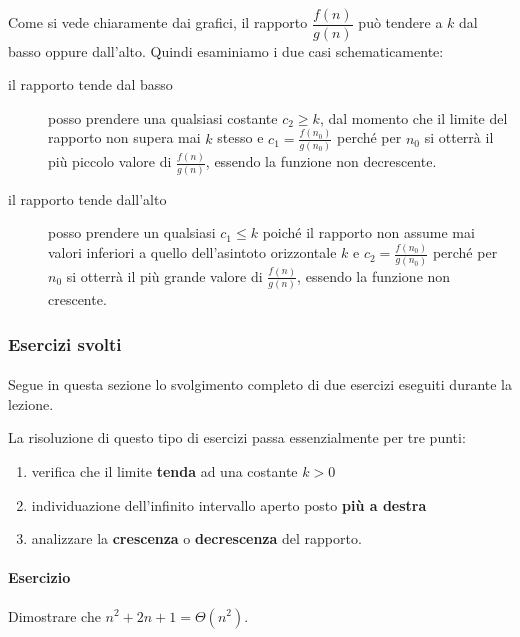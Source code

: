 \documentclass[11pt,a4paper,oneside]{article}
\begin{document}
\paragraph*{}Come si vede chiaramente dai grafici, il rapporto $\dfrac{f(n)}{g(n)}$ può tendere a $k$ dal basso oppure dall'alto. Quindi esaminiamo i due casi schematicamente:
\begin{description}
	\item[il rapporto tende dal basso] posso prendere una qualsiasi costante $c_2 \geq k$, dal momento che il limite del rapporto non supera mai $k$ stesso e $c_1 = \frac{f(n_0)}{g(n_0)}$ perché per $n_0$ si otterrà il più piccolo valore di $\frac{f(n)}{g(n)}$, essendo la funzione non decrescente.
	\item[il rapporto tende dall'alto] posso prendere un qualsiasi $c_1 \leq k$ poiché il rapporto non assume mai valori inferiori a quello dell'asintoto orizzontale $k$ e $c_2 = \frac{f(n_0)}{g(n_0)}$ perché per $n_0$ si otterrà il più grande valore di $\frac{f(n)}{g(n)}$, essendo la funzione non crescente.
\end{description}
\pagebreak
\subsubsection{Esercizi svolti}
\paragraph*{} Segue in questa sezione lo svolgimento completo di due esercizi eseguiti durante la lezione. 

\begin{tcolorbox}[title=Ricorda che...]
	La risoluzione di questo tipo di esercizi passa essenzialmente per tre punti:
	\begin{enumerate}
		\item verifica che il limite \textbf{tenda} ad una costante $k > 0$
		\item individuazione dell'infinito intervallo aperto posto \textbf{più a destra}
		\item analizzare la \textbf{crescenza} o \textbf{decrescenza} del rapporto.
	\end{enumerate}
\end{tcolorbox}


\paragraph*{Esercizio} Dimostrare che $n^2+2n+1 = \Theta(n^2)$.
\end{document}

